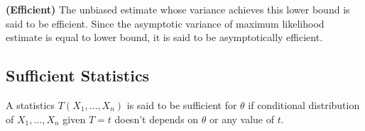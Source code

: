 \begin{definition}{\textbf{(Efficient)}}
    The unbiased estimate whose variance achieves this lower bound is said to be efficient. Since the asymptotic variance of maximum likelihood estimate is equal to lower bound, it is said to be asymptotically efficient. 
\end{definition}

\subsection{Sufficient Statistics}

\begin{definition}
    A statistics $T(X_1,\dots,X_n)$ is said to be sufficient for $\theta$ if conditional distribution of $X_1,\dots,X_n$ given $T=t$ doesn't depends on $\theta$ or any value of $t$. 
\end{definition}

